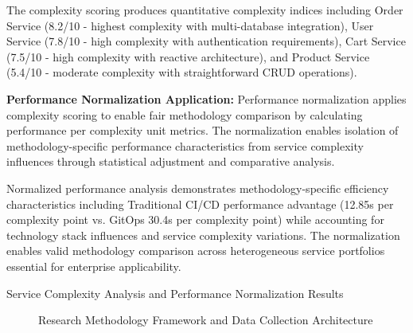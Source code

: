 The complexity scoring produces quantitative complexity indices including Order Service (8.2/10 - highest complexity with multi-database integration), User Service (7.8/10 - high complexity with authentication requirements), Cart Service (7.5/10 - high complexity with reactive architecture), and Product Service (5.4/10 - moderate complexity with straightforward CRUD operations).

\textbf{Performance Normalization Application:}
Performance normalization applies complexity scoring to enable fair methodology comparison by calculating performance per complexity unit metrics. The normalization enables isolation of methodology-specific performance characteristics from service complexity influences through statistical adjustment and comparative analysis.

Normalized performance analysis demonstrates methodology-specific efficiency characteristics including Traditional CI/CD performance advantage (12.85s per complexity point vs. GitOps 30.4s per complexity point) while accounting for technology stack influences and service complexity variations. The normalization enables valid methodology comparison across heterogeneous service portfolios essential for enterprise applicability.

\begin{table}[H]
\centering
\caption{Service Complexity Analysis and Performance Normalization Results}
\label{tab:service-complexity-analysis}
\end{table}

\begin{figure}[H]
\centering
\caption{Research Methodology Framework and Data Collection Architecture}
\label{fig:research-methodology-framework}
\end{figure}